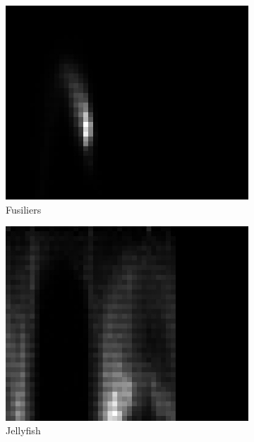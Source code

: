 \documentclass[10pt,twocolumn,letterpaper]{article}
\begin{document}
\begin{figure}[ht]
\begin{center}
	\begin{subfigure}[b]{0.24\linewidth}
		\includegraphics[width=\textwidth]{Angelfish_hist.jpg}
		\caption{Fusiliers}
	\end{subfigure}
	\begin{subfigure}[b]{0.24\linewidth}
		\includegraphics[width=\textwidth]{Jellyfish_hist.jpg}
		\caption{Jellyfish}
	\end{subfigure}
	\begin{subfigure}[b]{0.24\linewidth}

\end{subfigure}
\end{center}
\end{figure}
\end{document}
